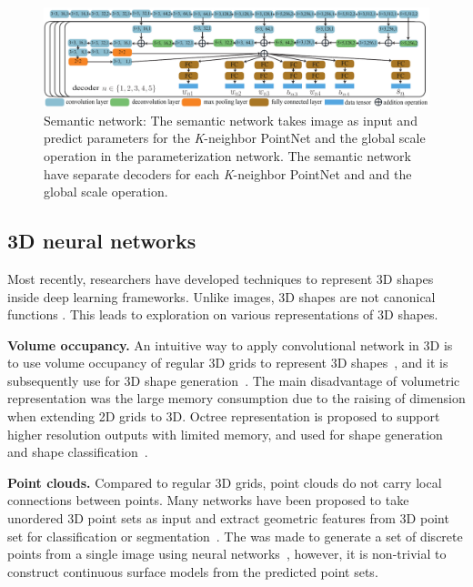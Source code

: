 \begin{figure}[htbp]
	\centering
	\includegraphics[width=\linewidth]{img/net/semnet}
	\caption{Semantic network: The semantic network takes image as input and predict parameters for the \textit{K}-neighbor PointNet and the global scale operation in the parameterization network. The semantic network have separate decoders for each \textit{K}-neighbor PointNet and and the global scale operation. }
	\label{fig:semnet}
\end{figure}

\subsection{3D neural networks}
Most recently, researchers have developed techniques to represent 3D shapes inside deep learning frameworks.%
Unlike images, 3D shapes are not canonical functions . 
This leads to exploration on various representations of 3D shapes.

\noindent\textbf{Volume occupancy.} 
An intuitive way to apply convolutional network in 3D is to use volume occupancy of regular 3D grids to represent 3D shapes~\cite{3dshapenet}, and it is subsequently use for 3D shape generation~\cite{3DR2N2,learnobj}.
%
The main disadvantage of volumetric representation was the large memory consumption due to the raising of dimension when extending 2D grids to 3D. 
Octree representation is proposed to support higher resolution outputs with limited memory, and used for shape generation~\cite{octreegen} and shape classification~\cite{ocnn}.

\noindent\textbf{Point clouds.} 
Compared to regular 3D grids, point clouds do not carry local connections between points. 
Many networks have been proposed to take unordered 3D point sets as input and extract geometric features from 3D point set for classification or segmentation~\cite{PointNet,NIPS2017_7095,pointcnn}.
%
The  was made to generate a set of discrete points from a single image using neural networks~\cite{PSGN}, however, it is non-trivial to construct continuous surface models from the predicted point sets. 



